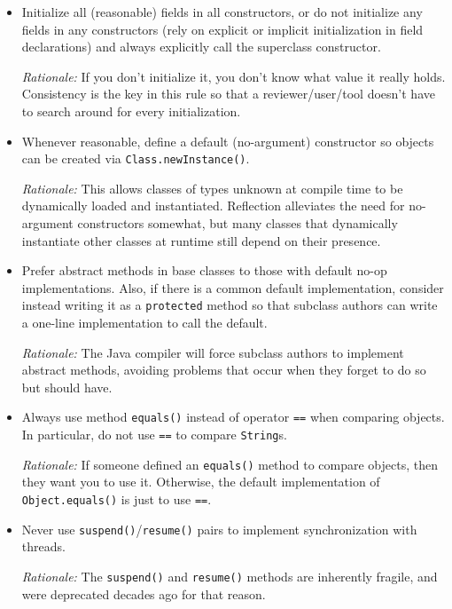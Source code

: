 \begin{itemize}
    \item
    Initialize all (reasonable) fields in all constructors, or do not initialize any fields in any constructors (rely on explicit or implicit initialization in field declarations) and always explicitly call the superclass constructor.

    \emph{Rationale:} If you don't initialize it, you don't know what value it really holds. Consistency is the key in this rule so that a reviewer/user/tool doesn't have to search around for every initialization.

    \item 
    Whenever reasonable, define a default (no-argument) constructor so objects can be created via \texttt{Class.newInstance()}.

    \emph{Rationale:} This allows classes of types unknown at compile time to be dynamically loaded and instantiated. Reflection alleviates the need for no-argument constructors somewhat, but many classes that dynamically instantiate other classes at runtime still depend on their presence.

    \item 
    Prefer abstract methods in base classes to those with default no-op implementations. Also, if there is a common default implementation, consider instead writing it as a \texttt{protected} method so that subclass authors can write a one-line implementation to call the default.

    \emph{Rationale:} The Java compiler will force subclass authors to implement abstract methods, avoiding problems that occur when they forget to do so but should have.

    \item 
    Always use method \texttt{equals()} instead of operator \texttt{==} when comparing objects. In particular, do not use \texttt{==} to compare \texttt{String}s.

    \emph{Rationale:} If someone defined an \texttt{equals()} method to compare objects, then they want you to use it. Otherwise, the default implementation of \texttt{Object.equals()} is just to use \texttt{==}.

    \item 
    Never use \texttt{suspend()}/\texttt{resume()} pairs to implement synchronization with threads.

    \emph{Rationale:} The \texttt{suspend()} and \texttt{resume()} methods are inherently fragile, and were deprecated 
    decades ago for that reason.


\end{itemize}
